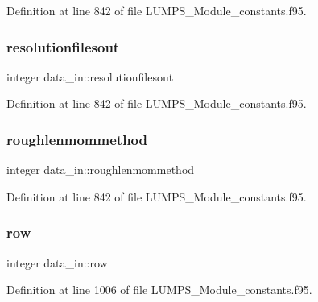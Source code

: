 Definition at line 842 of file L\+U\+M\+P\+S\+\_\+\+Module\+\_\+constants.\+f95.

\mbox{\label{namespacedata__in_a6ea370f15cdb7fab545340173792072a}} 
\subsubsection{\texorpdfstring{resolutionfilesout}{resolutionfilesout}}
{\footnotesize\ttfamily integer data\+\_\+in\+::resolutionfilesout}



Definition at line 842 of file L\+U\+M\+P\+S\+\_\+\+Module\+\_\+constants.\+f95.

\mbox{\label{namespacedata__in_ae0baee62dbc6ad6a70c51f5eb1c1882b}} 
\subsubsection{\texorpdfstring{roughlenmommethod}{roughlenmommethod}}
{\footnotesize\ttfamily integer data\+\_\+in\+::roughlenmommethod}



Definition at line 842 of file L\+U\+M\+P\+S\+\_\+\+Module\+\_\+constants.\+f95.

\mbox{\label{namespacedata__in_adf1b4fbb82731352f1a733cb1824c4b6}} 
\subsubsection{\texorpdfstring{row}{row}}
{\footnotesize\ttfamily integer data\+\_\+in\+::row}



Definition at line 1006 of file L\+U\+M\+P\+S\+\_\+\+Module\+\_\+constants.\+f95.

\mbox{\label{namespacedata__in_ae2ab3d89e50ddafe5bdb6f79aeb6d690}} 
